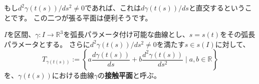 もし$d^2\gamma(t(s))/ds^2\neq0$であれば、これは$d\gamma(t(s))/ds$と直交するということです。
この二つが張る平面は便利そうです。
\begin{definition}\label{definition:tangent_plane}
  $I$を区間、$\gamma:I\to\mathbb{R}^3$を弧長パラメータ付け可能な曲線とし、$s=s(t)$をその弧長パラメータとする。
  さらに$d^2\gamma(t(s))/ds^2\neq0$を満たす$s\in s(I)$に対して、
  \[
    T_{\gamma(t(s))}:=\left\{a\frac{d\gamma(t(s))}{ds}+b\frac{d^2\gamma(t(s))}{ds^2}\mid a,b\in\mathbb{R}\right\}
  \]
  を、$\gamma(t(s))$における曲線$\gamma$の\textbf{接触平面}と呼ぶ。
\end{definition}
